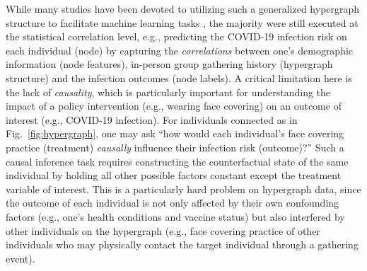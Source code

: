 While many studies have been devoted to utilizing such a generalized hypergraph structure to facilitate machine learning tasks \cite{bai2021hypergraph,feng2019hypergraph,yadati2018hypergcn,zhang2019hyper}, the majority were still executed at the statistical correlation level, e.g., 
{ predicting the COVID-19 infection risk on each individual (node) by capturing the \textit{correlations} between one's demographic information (node features), in-person group gathering history (hypergraph structure) and the infection outcomes (node labels).}
A critical limitation here is the lack of \textit{causality}, which is particularly important for understanding the impact of a policy intervention { (e.g., wearing face covering) on an outcome of interest (e.g., COVID-19 infection).} %
{ For individuals connected as in Fig.~\ref{fig:hypergraph}, one may ask ``how would each individual's face covering practice (treatment) \textit{causally} influence their infection risk (outcome)?''} 
Such a causal inference task requires constructing the counterfactual state of the same individual by holding all other possible factors constant except the treatment variable of interest. This is a particularly hard problem on hypergraph data, since the outcome of each individual is not only affected by their own confounding factors 
(e.g., one's health conditions and vaccine status) 
but also interfered by other individuals on the hypergraph
{ (e.g., face covering practice of other individuals who may physically contact the target individual through a gathering event).}

